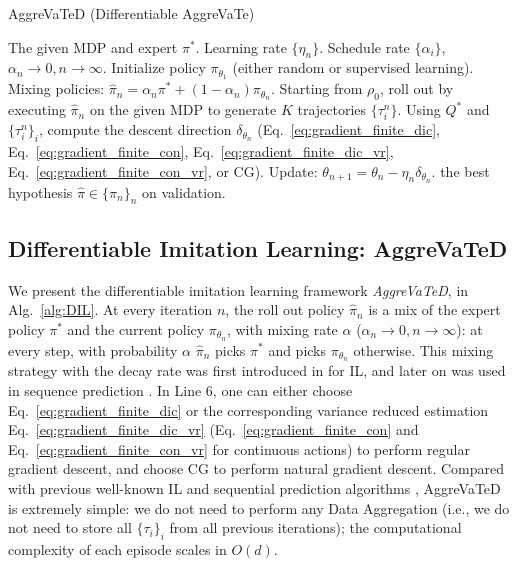 \documentclass{article}
\begin{document}
\begin{algorithm}[tb]
 \caption{AggreVaTeD (Differentiable AggreVaTe)}
 \begin{algorithmic}[1]
 \label{alg:DIL}
  The given MDP and expert $\pi^*$.  Learning rate $\{\eta_n\}$. Schedule rate $\{\alpha_i\}$, $\alpha_n\to0, n\to\infty$. 
 \STATE Initialize policy $\pi_{\theta_1}$ (either random or supervised learning). 
    \STATE Mixing policies: $\hat{\pi}_n= \alpha_n\pi^* + (1-\alpha_n)\pi_{\theta_n}$.
    \STATE \label{line:rolling_in} Starting from $\rho_0$, roll out by executing $\hat{\pi}_{n}$ on the given MDP to generate $K$ trajectories $\{\tau_i^n\}$.
    \STATE Using $Q^*$ and $\{\tau_i^n\}_i$, compute the descent direction $\delta_{\theta_n}$ (Eq.~\ref{eq:gradient_finite_dic}, Eq.~\ref{eq:gradient_finite_con},
    Eq.~\ref{eq:gradient_finite_dic_vr}, Eq.~\ref{eq:gradient_finite_con_vr}, or CG).
    \label{line:gradient_compute}
    \STATE Update: $\theta_{n+1} = \theta_n - \eta_n\delta_{\theta_n}$.
\ENDFOR
  the best hypothesis $\hat{\pi}\in\{\pi_n\}_n$ on validation.
 \end{algorithmic}
\end{algorithm}


\subsection{Differentiable Imitation Learning: AggreVaTeD}
We present the differentiable imitation learning framework \emph{AggreVaTeD}, in Alg.~\ref{alg:DIL}. At every iteration $n$, the roll out policy $\hat{\pi}_n$ is a mix of the expert policy $\pi^*$ and the current policy $\pi_{\theta_n}$, with mixing rate $\alpha$ ($\alpha_n\to0, n\to\infty$): at every step, with probability $\alpha$ $\hat{\pi}_n$ picks $\pi^*$ and picks $\pi_{\theta_n}$ otherwise. This mixing strategy with the decay rate was first introduced in \cite{Ross2011_AISTATS} for IL, and later on was used in sequence prediction \cite{bengio2015scheduled}. In Line 6, %
one can either choose Eq.~\ref{eq:gradient_finite_dic} or the corresponding variance reduced estimation Eq.~\ref{eq:gradient_finite_dic_vr} (Eq.~\ref{eq:gradient_finite_con} and Eq.~\ref{eq:gradient_finite_con_vr} for continuous actions) to perform regular gradient descent, and choose CG to perform natural gradient descent. Compared with previous well-known IL and sequential prediction algorithms \cite{Ross2011_AISTATS,ross2014reinforcement,chang2015learning}, AggreVaTeD is extremely simple: we do not need to perform any Data Aggregation (i.e., we do not need to store all $\{\tau_i\}_i$ from all previous iterations); the computational complexity of each episode scales in $O(d)$. %
\end{document}
